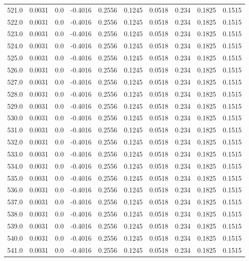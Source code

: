 \begin{longtable}{lrrrrrrrrr}
521.0 & 0.0031 & 0.0 & -0.4016 & 0.2556 & 0.1245 & 0.0518 & 0.234 & 0.1825 & 0.1515 \\
522.0 & 0.0031 & 0.0 & -0.4016 & 0.2556 & 0.1245 & 0.0518 & 0.234 & 0.1825 & 0.1515 \\
523.0 & 0.0031 & 0.0 & -0.4016 & 0.2556 & 0.1245 & 0.0518 & 0.234 & 0.1825 & 0.1515 \\
524.0 & 0.0031 & 0.0 & -0.4016 & 0.2556 & 0.1245 & 0.0518 & 0.234 & 0.1825 & 0.1515 \\
525.0 & 0.0031 & 0.0 & -0.4016 & 0.2556 & 0.1245 & 0.0518 & 0.234 & 0.1825 & 0.1515 \\
526.0 & 0.0031 & 0.0 & -0.4016 & 0.2556 & 0.1245 & 0.0518 & 0.234 & 0.1825 & 0.1515 \\
527.0 & 0.0031 & 0.0 & -0.4016 & 0.2556 & 0.1245 & 0.0518 & 0.234 & 0.1825 & 0.1515 \\
528.0 & 0.0031 & 0.0 & -0.4016 & 0.2556 & 0.1245 & 0.0518 & 0.234 & 0.1825 & 0.1515 \\
529.0 & 0.0031 & 0.0 & -0.4016 & 0.2556 & 0.1245 & 0.0518 & 0.234 & 0.1825 & 0.1515 \\
530.0 & 0.0031 & 0.0 & -0.4016 & 0.2556 & 0.1245 & 0.0518 & 0.234 & 0.1825 & 0.1515 \\
531.0 & 0.0031 & 0.0 & -0.4016 & 0.2556 & 0.1245 & 0.0518 & 0.234 & 0.1825 & 0.1515 \\
532.0 & 0.0031 & 0.0 & -0.4016 & 0.2556 & 0.1245 & 0.0518 & 0.234 & 0.1825 & 0.1515 \\
533.0 & 0.0031 & 0.0 & -0.4016 & 0.2556 & 0.1245 & 0.0518 & 0.234 & 0.1825 & 0.1515 \\
534.0 & 0.0031 & 0.0 & -0.4016 & 0.2556 & 0.1245 & 0.0518 & 0.234 & 0.1825 & 0.1515 \\
535.0 & 0.0031 & 0.0 & -0.4016 & 0.2556 & 0.1245 & 0.0518 & 0.234 & 0.1825 & 0.1515 \\
536.0 & 0.0031 & 0.0 & -0.4016 & 0.2556 & 0.1245 & 0.0518 & 0.234 & 0.1825 & 0.1515 \\
537.0 & 0.0031 & 0.0 & -0.4016 & 0.2556 & 0.1245 & 0.0518 & 0.234 & 0.1825 & 0.1515 \\
538.0 & 0.0031 & 0.0 & -0.4016 & 0.2556 & 0.1245 & 0.0518 & 0.234 & 0.1825 & 0.1515 \\
539.0 & 0.0031 & 0.0 & -0.4016 & 0.2556 & 0.1245 & 0.0518 & 0.234 & 0.1825 & 0.1515 \\
540.0 & 0.0031 & 0.0 & -0.4016 & 0.2556 & 0.1245 & 0.0518 & 0.234 & 0.1825 & 0.1515 \\
541.0 & 0.0031 & 0.0 & -0.4016 & 0.2556 & 0.1245 & 0.0518 & 0.234 & 0.1825 & 0.1515 \\

\end{longtable}
